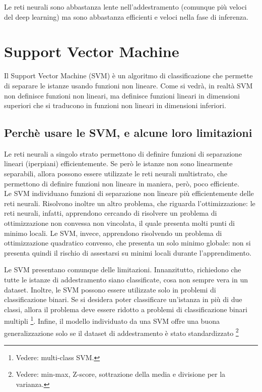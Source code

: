 Le reti neurali sono abbastanza lente nell'addestramento (comunque più veloci
del deep learning) ma sono abbastanza efficienti e veloci nella fase di
inferenza.

\section{Support Vector Machine}
Il Support Vector Machine (SVM) è un algoritmo di classificazione che permette
di separare le istanze usando funzioni non lineare. Come si vedrà, in realtà
SVM non definisce funzioni non lineari, ma definisce funzioni lineari in
dimensioni superiori che si traducono in funzioni non lineari in dimensioni
inferiori. 

\subsection{Perchè usare le SVM, e alcune loro limitazioni}
Le reti neurali a singolo strato permettono di definire funzioni di separazione
lineari (iperpiani) efficientemente. Se però le istanze non sono linearmente
separabili, allora possono essere utilizzate le reti neurali multistrato, che
permettono di definire funzioni non lineare in maniera, però, poco efficiente.\\
Le SVM individuano funzioni di separazione non lineare più efficientemente delle
reti neurali. Risolvono inoltre un altro problema, che riguarda
l'ottimizzazione: le reti neurali, infatti, apprendono cercando di risolvere un
problema di ottimizzazione non convessa non vincolata, il quale presenta molti
punti di minimo locali. Le SVM, invece, apprendono risolvendo un problema di
ottimizzazione quadratico convesso, che presenta un solo minimo globale: non si
presenta quindi il rischio di assestarsi su minimi locali durante
l'apprendimento.

Le SVM presentano comunque delle limitazioni. Innanzitutto, richiedono che tutte
le istanze di addestramento siano classificate, cosa non sempre vera in un
dataset.
Inoltre, le SVM possono essere utilizzate solo in problemi di classificazione
binari. Se si desidera poter classificare un'istanza in più di due classi,
allora il problema deve essere ridotto a problemi di classificazione binari
multipli \footnote{Vedere: multi-class SVM.}.
Infine, il modello individuato da una SVM offre una buona generalizzazione solo
se il dataset di addestramento è stato standardizzato \footnote{Vedere: min-max,
Z-score, sottrazione della media e divisione per la varianza.}

